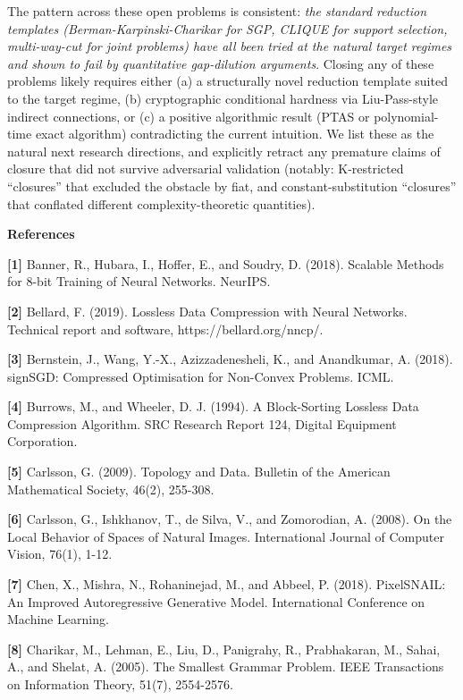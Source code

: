 \documentclass[
]{article}
\begin{document}
The pattern across these open problems is consistent: \emph{the
standard reduction templates (Berman-Karpinski-Charikar for SGP,
CLIQUE for support selection, multi-way-cut for joint problems)
have all been tried at the natural target regimes and shown to
fail by quantitative gap-dilution arguments}. Closing any of these
problems likely requires either (a) a structurally novel reduction
template suited to the target regime, (b) cryptographic conditional
hardness via Liu-Pass-style indirect connections, or (c) a positive
algorithmic result (PTAS or polynomial-time exact algorithm)
contradicting the current intuition. We list these as the natural
next research directions, and explicitly retract any premature
claims of closure that did not survive adversarial validation (notably: K-restricted ``closures'' that excluded the
obstacle by fiat, and constant-substitution ``closures'' that
conflated different complexity-theoretic quantities).

\textbf{References}

\textbf{{[}1{]}} Banner, R., Hubara, I., Hoffer, E., and Soudry, D.
(2018). Scalable Methods for 8-bit Training of Neural Networks. NeurIPS.

\textbf{{[}2{]}} Bellard, F. (2019). Lossless Data Compression with
Neural Networks. Technical report and software,
https://bellard.org/nncp/.

\textbf{{[}3{]}} Bernstein, J., Wang, Y.-X., Azizzadenesheli, K., and
Anandkumar, A. (2018). signSGD: Compressed Optimisation for Non-Convex
Problems. ICML.

\textbf{{[}4{]}} Burrows, M., and Wheeler, D. J. (1994). A Block-Sorting
Lossless Data Compression Algorithm. SRC Research Report 124, Digital
Equipment Corporation.

\textbf{{[}5{]}} Carlsson, G. (2009). Topology and Data. Bulletin of the
American Mathematical Society, 46(2), 255-308.

\textbf{{[}6{]}} Carlsson, G., Ishkhanov, T., de Silva, V., and
Zomorodian, A. (2008). On the Local Behavior of Spaces of Natural
Images. International Journal of Computer Vision, 76(1), 1-12.

\textbf{{[}7{]}} Chen, X., Mishra, N., Rohaninejad, M., and Abbeel, P.
(2018). PixelSNAIL: An Improved Autoregressive Generative Model.
International Conference on Machine Learning.

\textbf{{[}8{]}} Charikar, M., Lehman, E., Liu, D., Panigrahy, R.,
Prabhakaran, M., Sahai, A., and Shelat, A. (2005). The Smallest Grammar
Problem. IEEE Transactions on Information Theory, 51(7), 2554-2576.
\end{document}
